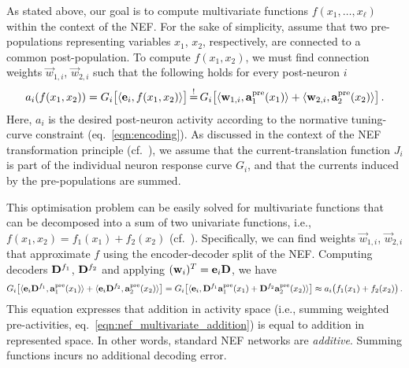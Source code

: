 As stated above, our goal is to compute multivariate functions $f(x_1, \ldots, x_\ell)$ within the context of the NEF.
For the sake of simplicity, assume that two pre-populations representing variables $x_1$, $x_2$, respectively, are connected to a common post-population.
To compute $f(x_1, x_2)$, we must find connection weights $\vec w_{1, i}$, $\vec w_{2, i}$ such that the following holds for every post-neuron $i$
\begin{align}
	a_i(f(x_1, x_2))
		= G_i \bigl[
			\langle \mathbf{e}_i, f(x_1, x_2) \rangle
		\bigr]
		\operatorname{\overset{!}{=}} G_i\bigl[
			\langle \mathbf{w}_{1, i}, \mathbf{a}^\mathrm{pre}_1(x_1) \rangle + \langle \mathbf{w}_{2, i}, \mathbf{a}^\mathrm{pre}_2(x_2)
		\rangle\bigr] \,.
	\label{eqn:nef_multivariate_addition}
\end{align}
Here, $a_i$ is the desired post-neuron activity according to the normative tuning-curve constraint (eq.~\ref{eqn:encoding}).
As discussed in the context of the NEF transformation principle (cf.~), we assume that the current-translation function $J_i$ is part of the individual neuron response curve $G_i$, and that the currents induced by the pre-populations are summed.

This optimisation problem can be easily solved for multivariate functions that can be decomposed into a sum of two univariate functions, i.e., $f(x_1, x_2) = f_1(x_1) + f_2(x_2)$ (cf.~).
Specifically, we can find weights $\vec w_{1, i}$, $\vec w_{2, i}$ that approximate $f$ using the encoder-decoder split of the NEF. %
Computing decoders $\mathbf{D}^{f_1}$, $\mathbf{D}^{f_2}$ and applying $(\mathbf{w}_i)^T = \mathbf{e}_i \mathbf{D}$, we have
\begin{align*}
	G_i\bigl[
	  \langle
	  	\mathbf{e}_i \mathbf{D}^{f_1},
	  	\mathbf{a}^\mathrm{pre}_1(x_1)
	  \rangle
	+ \langle
	  	\mathbf{e}_i \mathbf{D}^{f_2},
		\mathbf{a}^\mathrm{pre}_2(x_2)
	\rangle\bigr] = 
	G_i\bigl[\langle \mathbf{e}_i, \mathbf{D}^{f_1} \mathbf{a}_1^\mathrm{pre}(x_1) + \mathbf{D}^{f_2} \mathbf{a}_2^\mathrm{pre}(x_2) \rangle\bigr]
	\approx a_i\bigl(f_1(x_1) + f_2(x_2)\bigr) \,.
\end{align*}
This equation expresses that addition in activity space (i.e., summing weighted pre-activities, eq.~\ref{eqn:nef_multivariate_addition}) is equal to addition in represented space.
In other words, standard NEF networks are \emph{additive}.
Summing functions incurs no additional decoding error.

